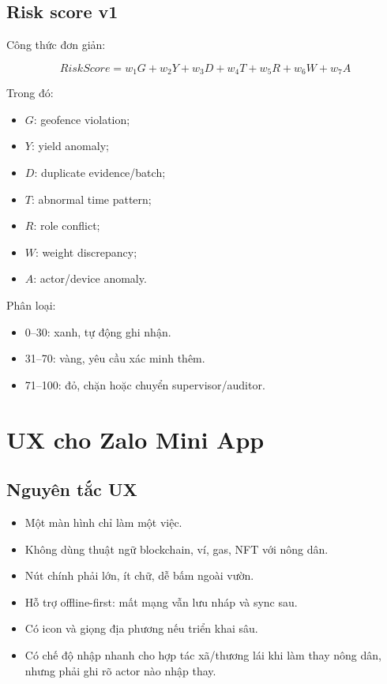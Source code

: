 \documentclass[12pt,a4paper]{article}
\begin{document}
\subsection{Risk score v1}

Công thức đơn giản:

\[
RiskScore = w_1G + w_2Y + w_3D + w_4T + w_5R + w_6W + w_7A
\]

Trong đó:
\begin{itemize}[leftmargin=2em]
    \item $G$: geofence violation;
    \item $Y$: yield anomaly;
    \item $D$: duplicate evidence/batch;
    \item $T$: abnormal time pattern;
    \item $R$: role conflict;
    \item $W$: weight discrepancy;
    \item $A$: actor/device anomaly.
\end{itemize}

Phân loại:
\begin{itemize}[leftmargin=2em]
    \item 0--30: xanh, tự động ghi nhận.
    \item 31--70: vàng, yêu cầu xác minh thêm.
    \item 71--100: đỏ, chặn hoặc chuyển supervisor/auditor.
\end{itemize}

\section{UX cho Zalo Mini App}

\subsection{Nguyên tắc UX}

\begin{itemize}[leftmargin=2em]
    \item Một màn hình chỉ làm một việc.
    \item Không dùng thuật ngữ blockchain, ví, gas, NFT với nông dân.
    \item Nút chính phải lớn, ít chữ, dễ bấm ngoài vườn.
    \item Hỗ trợ offline-first: mất mạng vẫn lưu nháp và sync sau.
    \item Có icon và giọng địa phương nếu triển khai sâu.
    \item Có chế độ nhập nhanh cho hợp tác xã/thương lái khi làm thay nông dân, nhưng phải ghi rõ actor nào nhập thay.
\end{itemize}
\end{document}
